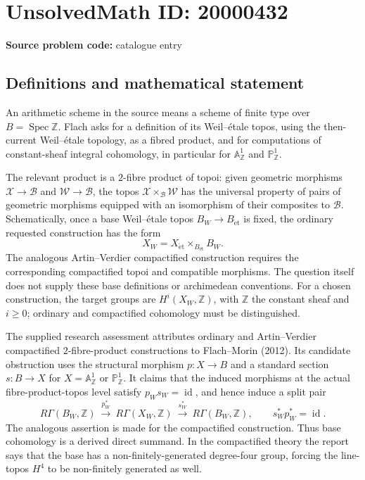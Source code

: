 \documentclass[11pt]{article}
\newcommand{\Z}{\mathbb{Z}}
\newcommand{\A}{\mathbb{A}}
\newcommand{\PP}{\mathbb{P}}
\begin{document}
\section*{UnsolvedMath ID: 20000432}
\textbf{Source problem code:} catalogue entry
\subsection{Definitions and mathematical statement}
An arithmetic scheme in the source means a scheme of finite type over \(B=\operatorname{Spec}\Z\). Flach asks for a definition of its Weil--\'etale topos, using the then-current Weil--\'etale topology, as a fibred product, and for computations of constant-sheaf integral cohomology, in particular for \(\A^1_{\Z}\) and \(\PP^1_{\Z}\).

The relevant product is a \(2\)-fibre product of topoi: given geometric morphisms \(\mathcal X\to\mathcal B\) and \(\mathcal W\to\mathcal B\), the topos \(\mathcal X\times_{\mathcal B}\mathcal W\) has the universal property of pairs of geometric morphisms equipped with an isomorphism of their composites to \(\mathcal B\). Schematically, once a base Weil--\'etale topos \(B_W\to B_{\mathrm{\acute et}}\) is fixed, the ordinary requested construction has the form
\[
 X_W=X_{\mathrm{\acute et}}\times_{B_{\mathrm{\acute et}}}B_W.
\]
The analogous Artin--Verdier compactified construction requires the corresponding compactified topoi and compatible morphisms. The question itself does not supply these base definitions or archimedean conventions. For a chosen construction, the target groups are \(H^i(X_W,\Z)\), with \(\Z\) the constant sheaf and \(i\ge0\); ordinary and compactified cohomology must be distinguished.

The supplied research assessment attributes ordinary and Artin--Verdier compactified \(2\)-fibre-product constructions to Flach--Morin (2012). Its candidate obstruction uses the structural morphism \(p:X\to B\) and a standard section \(s:B\to X\) for \(X=\A^1_{\Z}\) or \(\PP^1_{\Z}\). It claims that the induced morphisms at the actual fibre-product-topos level satisfy \(p_Ws_W=\operatorname{id}\), and hence induce a split pair
\[
 R\Gamma(B_W,\Z)\ \xrightarrow{p_W^*}\ R\Gamma(X_W,\Z)
 \ \xrightarrow{s_W^*}\ R\Gamma(B_W,\Z),\qquad
 s_W^*p_W^*=\operatorname{id}.
\]
The analogous assertion is made for the compactified construction. Thus base cohomology is a derived direct summand. In the compactified theory the report says that the base has a non-finitely-generated degree-four group, forcing the line-topos \(H^4\) to be non-finitely generated as well.
\end{document}
